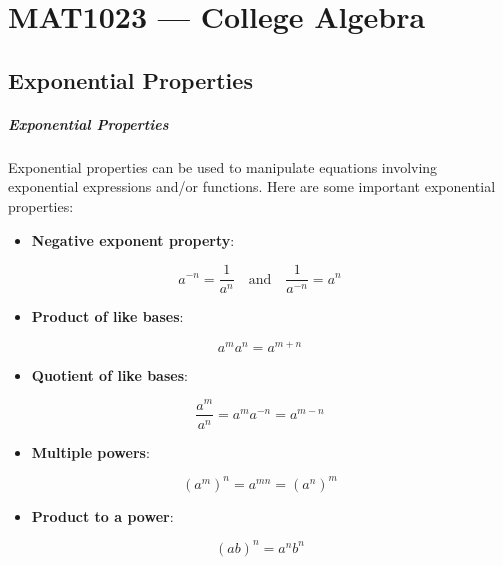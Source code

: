 \chapter{MAT1023 --- College Algebra}
\label{chap:unit1}

\ChapterWarning

\section{Exponential Properties}
\label{sec:exponential-properties}

\paragraph{Exponential Properties}

Exponential properties can be used to manipulate equations involving exponential expressions and/or functions. Here are some important exponential properties:

\begin{itemize}
    \item \textbf{Negative exponent property}:
\end{itemize}
  $$
  a^{-n} = \frac{1}{a^n} \quad \text{and} \quad \frac{1}{a^{-n}} = a^n
  $$

\begin{itemize}
    \item \textbf{Product of like bases}:
\end{itemize}
  $$
  a^m a^n = a^{m+n}
  $$

\begin{itemize}
    \item \textbf{Quotient of like bases}:
\end{itemize}
  $$
  \frac{a^m}{a^n} = a^m a^{-n} = a^{m-n}
  $$

\begin{itemize}
    \item \textbf{Multiple powers}:
\end{itemize}
  $$
  (a^m)^n = a^{mn} = (a^n)^m
  $$

\begin{itemize}
    \item \textbf{Product to a power}:
\end{itemize}
  $$
  (ab)^n = a^n b^n
  $$

